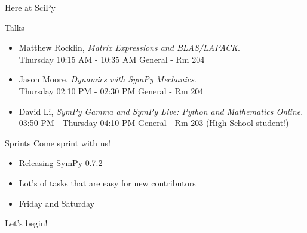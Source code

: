 \documentclass[xcolor=svgnames]{beamer}
\begin{document}
\begin{frame}{Here at SciPy}
  \begin{block}{Talks}
    \begin{itemize}
    \item Matthew Rocklin, \textit{Matrix Expressions and BLAS/LAPACK}. \\ \footnotesize Thursday 10:15
      AM - 10:35 AM General - Rm 204
    \item \normalsize Jason Moore, \textit{Dynamics with SymPy Mechanics}. \\
      \footnotesize Thursday 02:10 PM - 02:30
      PM General - Rm 204
    \item \normalsize David Li, \textit{SymPy Gamma and SymPy Live: Python and Mathematics
        Online}. \\ \footnotesize 03:50 PM -
      Thursday 04:10 PM General - Rm 203 (High School student!)
    \end{itemize}
  \end{block}
  \begin{block}{Sprints}
    Come sprint with us!
    \begin{itemize}
    \item Releasing SymPy 0.7.2
    \item Lot's of tasks that are easy for new contributors
    \item Friday and Saturday
    \end{itemize}
  \end{block}
\end{frame}

\begin{frame}
\Huge Let's begin!
\end{frame}
\end{document}
